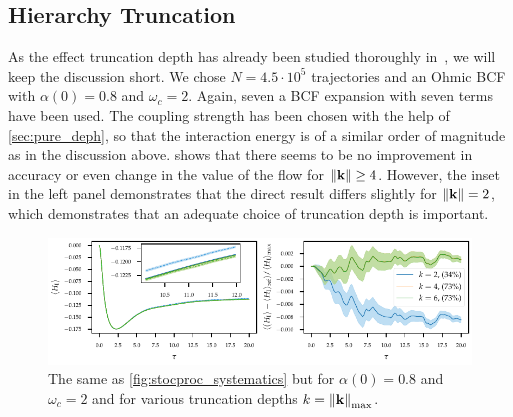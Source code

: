 \subsection{Hierarchy Truncation}
\label{sec:trunc}
As the effect truncation depth has already been studied thoroughly
in~\cite{RichardDiss}, we will keep the discussion short.  We chose
\(N=4.5 \cdot 10^5\) trajectories and an Ohmic BCF with \(α(0)=0.8\)
and \(ω_c=2\). Again, seven a BCF expansion with seven terms have been
used. The coupling strength has been chosen with the help of
\cref{sec:pure_deph}, so that the interaction energy is of a similar
order of magnitude as in the discussion
above.  shows that there seems to be no
improvement in accuracy or even change in the value of the flow for
\(\norm{\vb{k}}\geq 4\). However, the inset in the left panel
demonstrates that the direct result differs slightly for
\(\norm{\vb{k}} = 2\), which demonstrates that an adequate choice of
truncation depth is important.
\begin{figure}[h]
  \centering
  \includegraphics{figs/one_bath_syst/k_systematics_interaction}
  \caption{\label{fig:k_systematics} The same as
    \cref{fig:stocproc_systematics} but for \(α(0)=0.8\) and
    \(ω_c=2\) and for various truncation depths \(k=\norm{\vb{k}}_{\mathrm{max}}\).}
\end{figure}


